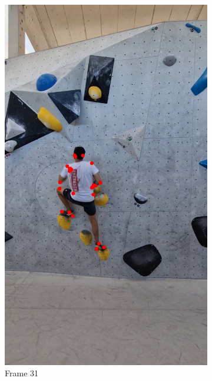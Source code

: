 \documentclass[./main.tex]{subfiles}
\begin{document}
\begin{figure}[htbp]
    \centering
    \begin{subfigure}{0.3\textwidth}
        \centering
        \includegraphics[width=\textwidth]{entities/CA_31.png}
        \caption{Frame 31}
    \end{subfigure}
    \begin{subfigure}{0.3\textwidth}
        \centering

\end{subfigure}
\end{figure}
\end{document}
